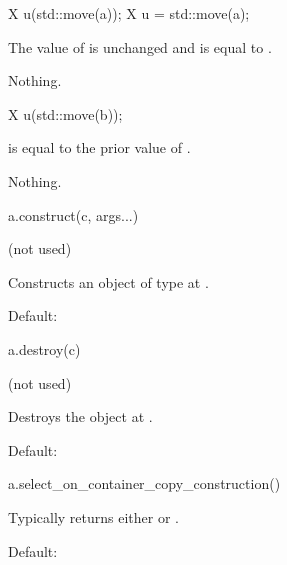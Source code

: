 \begin{itemdecl}
X u(std::move(a));
X u = std::move(a);
\end{itemdecl}

\begin{itemdescr}
\pnum
\ensures
The value of  is unchanged and is equal to .

\pnum
\throws
Nothing.
\end{itemdescr}

\begin{itemdecl}
X u(std::move(b));
\end{itemdecl}

\begin{itemdescr}
\pnum
\ensures
{} is equal to the prior value of .

\pnum
\throws
Nothing.
\end{itemdescr}

\begin{itemdecl}
a.construct(c, args...)
\end{itemdecl}

\begin{itemdescr}
\pnum
\result
(not used)

\pnum
\effects
Constructs an object of type  at .

\pnum
\remarks
Default:
\end{itemdescr}

\begin{itemdecl}
a.destroy(c)
\end{itemdecl}

\begin{itemdescr}
\pnum
\result
(not used)

\pnum
\effects
Destroys the object at .

\pnum
\remarks
Default: 
\end{itemdescr}

\begin{itemdecl}
a.select_on_container_copy_construction()
\end{itemdecl}

\begin{itemdescr}
\pnum
\result
{}

\pnum
\returns
Typically returns either  or .

\pnum
\remarks
Default: 
\end{itemdescr}

